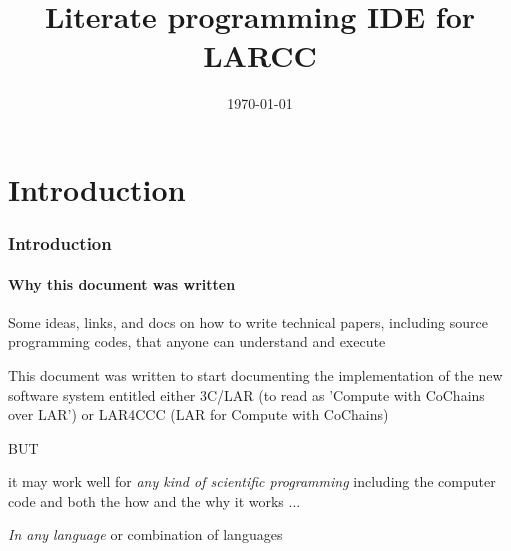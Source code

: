 \documentclass{beamer}
\title{Literate programming IDE for LARCC}
\date{\today}
\begin{document}
\frame{\titlepage}

\section[Outline]{}
\frame{\tableofcontents}

\section{Introduction}
\frame
{
  \frametitle{Introduction}
  \framesubtitle{Why this document was written}

Some ideas, links, and docs on how to write technical papers, including source programming codes, that anyone can understand and execute 

\vfill

This document was written to start documenting the implementation of the new software system entitled either 3C/LAR (to read as 'Compute with CoChains over LAR') or LAR4CCC (LAR for Compute with CoChains)

\vfill
BUT

\vfill
it may work well for \emph{any kind of scientific programming} \alert{including the computer code} and both \alert{the how} and \alert{the why} it works ... 

\emph{In any language} or combination of languages

}
\end{document}
